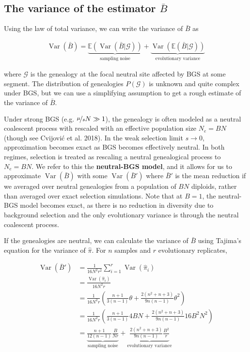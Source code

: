 \documentclass[11pt]{article}
\newcommand{\E}{\mathbb{E}}
\DeclareMathOperator{\var}{Var}
\begin{document}
\subsection*{The variance of the estimator $\bar{B}$}

Using the law of total variance, we can write the variance of $\bar{B}$ as 

\begin{align}
  \var(\bar{B}) = \underbrace{\E(\var(\bar{B} | \mathcal{G}))}_\text{sampling noise} + \underbrace{\var(\E(\bar{B} | \mathcal{G}))}_\text{evolutionary variance}
\end{align}

where $\mathcal{G}$ is the genealogy at the focal neutral site affected by BGS
at some segment. The distribution of genealogies $P(\mathcal{G})$ is unknown
and quite complex under BGS, but we can use a simplifying assumption to get a
rough estimate of the variance of $\bar{B}$.

Under strong BGS (e.g. $\nicefrac{\mu}{s}N \gg 1$), the genealogy is often
modeled as a neutral coalescent process with rescaled with an effective
population size $N_e = BN$ (though see Cvijovi\'{c} et al. 2018). In the weak
selection limit $s \to 0$, approximation becomes exact as BGS becomes
effectively neutral. In both regimes, selection is treated as rescaling a
neutral genealogical process to $N_e = BN$. We refer to this the
\textbf{neutral-BGS model}, and it allows for us to approximate $\var(\bar{B})$
with some $\var(\bar{B}')$ where $\bar{B}'$ is the mean reduction if we
averaged over neutral genealogies from a population of $BN$
diploids, rather than averaged over exact selection simulations. Note that at
$B=1$, the neutral-BGS model becomes exact, as there is no reduction in
diversity due to background selection and the only evolutionary variance is
through the neutral coalescent process.

If the genealogies are neutral, we can calculate the variance of $\bar{B}$
using Tajima's equation for the variance of $\hat{\pi}$. For $n$ samples and
$r$ evolutionary replicates,

\begin{align}
  \var(\bar{B}') &= \frac{1}{16 N^2 r^2} \sum_{i=1}^r \var(\hat{\pi}_{i}) \\
                &= \frac{\var(\hat{\pi}_{i})}{16 N^2 r} \\
                  &= \frac{1}{16N^2 r} \left( \frac{n + 1}{3(n-1)}\theta  + \frac{2(n^2 + n + 3)}{9n(n-1)}\theta^2 \right) \\
                  &= \frac{1}{16N^2 r} \left( \frac{n + 1}{3(n-1)} 4BN + \frac{2(n^2 + n + 3)}{9n(n-1)} 16B^2N^2 \right) \\
                  &= \underbrace{\frac{n + 1}{12(n-1)} \frac{B}{N r}}_\text{sampling noise} + \underbrace{\frac{2(n^2 + n + 3)}{9n(n-1)} \frac{B^2}{r}}_\text{evolutionary variance}
\end{align}
\end{document}

